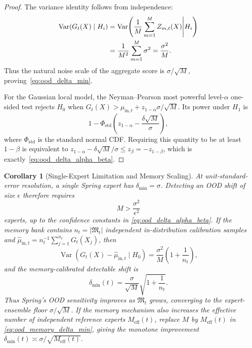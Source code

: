 \documentclass[11pt,twocolumn]{article}
\newtheorem{corollary}[theorem]{Corollary}
\theoremstyle{definition}
\DeclareMathOperator{\Var}{Var}
\begin{document}
\begin{proof}
The variance identity follows from independence:
\begin{align}
  \Var(G_t(X)\mid H_i)
  &=
  \Var\!\left(
  \frac{1}{M}\sum_{m=1}^M Z_{m,t}(X)
  \middle| H_i
  \right) \notag\\
  &=
  \frac{1}{M^2}\sum_{m=1}^M \sigma^2
  =
  \frac{\sigma^2}{M}.
\end{align}
Thus the natural noise scale of the aggregate score is
$\sigma/\sqrt{M}$, proving~\eqref{eq:ood_delta_min}.

For the Gaussian local model, the Neyman--Pearson most powerful level-$\alpha$
one-sided test rejects $H_0$ when
$G_t(X)>\mu_{\mathrm{in},t}+z_{1-\alpha}\sigma/\sqrt{M}$.  Its power under
$H_1$ is
\begin{equation}
  1-\Phi_{\mathrm{std}}\!\left(
  z_{1-\alpha}-\frac{\delta\sqrt{M}}{\sigma}
  \right),
\end{equation}
where $\Phi_{\mathrm{std}}$ is the standard normal CDF.  Requiring this
quantity to be at least $1-\beta$ is equivalent to
$z_{1-\alpha}-\delta\sqrt{M}/\sigma \le z_{\beta}=-z_{1-\beta}$, which is
exactly~\eqref{eq:ood_delta_alpha_beta}.
\end{proof}

\begin{corollary}[Single-Expert Limitation and Memory Scaling]
\label{cor:spring_memory_scaling}
At unit-standard-error resolution, a single Spring expert has
$\delta_{\min}=\sigma$.  Detecting an OOD shift of size $\epsilon$ therefore
requires
\begin{equation}
  M > \frac{\sigma^2}{\epsilon^2}
  \label{eq:ood_expert_requirement}
\end{equation}
experts, up to the confidence constants in
\eqref{eq:ood_delta_alpha_beta}.  If the memory bank contains
$n_t=|\mathfrak{M}_t|$ independent in-distribution calibration samples and
$\widehat{\mu}_{\mathrm{in},t}=n_t^{-1}\sum_{j=1}^{n_t}G_t(X_j)$, then
\begin{equation}
  \Var\!\left(G_t(X)-\widehat{\mu}_{\mathrm{in},t}\mid H_0\right)
  =
  \frac{\sigma^2}{M}\left(1+\frac{1}{n_t}\right),
\end{equation}
and the memory-calibrated detectable shift is
\begin{equation}
  \delta_{\min}(t)
  =
  \frac{\sigma}{\sqrt{M}}
  \sqrt{1+\frac{1}{n_t}}.
  \label{eq:ood_memory_delta_min}
\end{equation}
Thus Spring's OOD sensitivity improves as $\mathfrak{M}_t$ grows, converging
to the expert-ensemble floor $\sigma/\sqrt{M}$.  If the memory mechanism also
increases the effective number of independent reference experts
$M_{\mathrm{eff}}(t)$, replace $M$ by $M_{\mathrm{eff}}(t)$ in
\eqref{eq:ood_memory_delta_min}, giving the monotone improvement
$\delta_{\min}(t)\asymp \sigma/\sqrt{M_{\mathrm{eff}}(t)}$.
\end{corollary}
\end{document}
